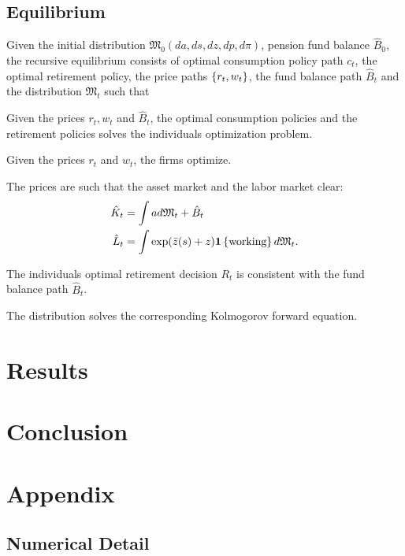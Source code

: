 \documentclass[a4paper, 12pt]{article}
\begin{document}
\subsection{Equilibrium}
Given the initial distribution $\mathfrak{M}_0(da,ds,dz,dp, d\pi)$,  
pension fund balance $\hat{B}_0$, the recursive equilibrium 
consists of optimal consumption policy path $c_t$, 
the optimal retirement policy, the price paths 
$\left\{ {r_t, w_t} \right\}$, the fund balance path $\hat{B}_t$ and the 
distribution $\mathfrak{M}_t$ such that 
\begin{thmenum}
    \item Given the prices $r_t, w_t$ and $\hat{B}_t$, the optimal 
    consumption policies and the retirement policies solves the 
    individuals optimization problem. 
    \item Given the prices $r_t$ and $w_t$, the firms optimize.
    \item The prices are such that the asset market and the 
    labor market clear: 
    \begin{align}
        \hat{K}_t &= \int a d\mathfrak{M}_t + \hat{B}_t \\ 
        \hat{L}_t &= \int \exp(\bar{z}(s) + z)\mathbf{1}\left\{ {\text{working}} \right\}d\mathfrak{M}_t. 
    \end{align}
    \item The individuals optimal retirement decision $R_t$ is 
    consistent with the fund balance path $\hat{B}_t$. 
    \item The distribution solves the corresponding 
    Kolmogorov forward equation.
\end{thmenum}

\section{Results}

\section{Conclusion}

\newpage
\section*{\centering Appendix}
\begin{appendices}
\section{Numerical Detail}
\end{appendices}




\end{document}
